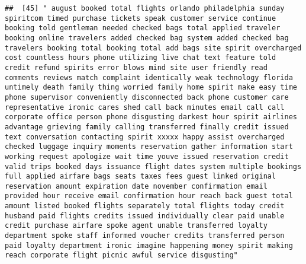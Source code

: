 \documentclass[
]{article}
\begin{document}
\begin{verbatim}
##  [45] " august booked total flights orlando philadelphia sunday spiritcom timed purchase tickets speak customer service continue booking told gentleman needed checked bags total applied traveler booking online travelers added checked bag system added checked bag travelers booking total booking total add bags site spirit overcharged cost countless hours phone utilizing live chat text feature told credit refund spirits error blows mind site user friendly read comments reviews match complaint identically weak technology florida untimely death family thing worried family home spirit make easy time phone supervisor conveniently disconnected back phone customer care representative ironic cares shed call back minutes email call call corporate office person phone disgusting darkest hour spirit airlines advantage grieving family calling transferred finally credit issued text conversation contacting spirit xxxxx happy assist overcharged checked luggage inquiry moments reservation gather information start working request apologize wait time youve issued reservation credit valid trips booked days issuance flight dates system multiple bookings full applied airfare bags seats taxes fees guest linked original reservation amount expiration date november confirmation email provided hour receive email confirmation hour reach back guest total amount listed booked flights separately total flights today credit husband paid flights credits issued individually clear paid unable credit purchase airfare spoke agent unable transferred loyalty department spoke staff informed voucher credits transferred person paid loyalty department ironic imagine happening money spirit making reach corporate flight picnic awful service disgusting"

\end{verbatim}
\end{document}
